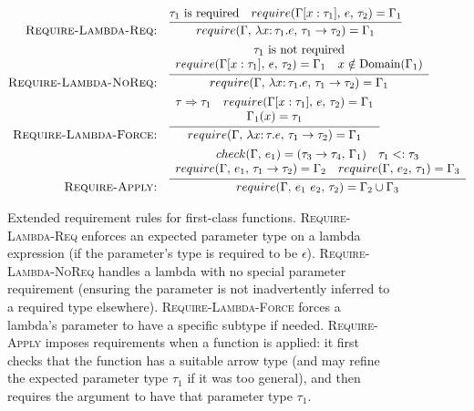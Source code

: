 \documentclass[10pt,conference]{IEEEtran}
\newcommand{\funct}[3]{\ensuremath{\lambda #1\mathsf{:}\,#2.#3}}
\newcommand{\apply}[2]{\ensuremath{#1\ #2}}
\newcommand{\arrowt}[2]{\ensuremath{{#1}\rightarrow{#2}}}
\newcommand{\checktype}[4]{\ensuremath{{check}(#1,\,#2)=(#3,\,#4)}}
\newcommand{\requiretype}[4]{\ensuremath{{require}(#1,\,#2,\,#3)=#4}}
\newcommand{\required}[1]{\ensuremath{#1\text{ is required}}}
\newcommand{\nrequired}[1]{\ensuremath{#1\text{ is not required}}}
\newcommand{\forcerequire}[2]{\ensuremath{#1\Rightarrow#2}}
\begin{document}
\begin{figure*}[ht]
\centering
\begin{framed}
\begin{align*}
\text{\textsc{Require-Lambda-Req:}} &\quad \infer{\requiretype{\Gamma}{\funct{x}{\tau_1}{e}}{\arrowt{\tau_1}{\tau_2}}{\Gamma_1}}{\required{\tau_1} \quad \requiretype{\Gamma[x:\tau_1]}{e}{\tau_2}{\Gamma_1}} \\
\text{\textsc{Require-Lambda-NoReq:}} &\quad \infer{\requiretype{\Gamma}{\funct{x}{\tau_1}{e}}{\arrowt{\tau_1}{\tau_2}}{\Gamma_1}}{
\begin{array}{c}
\nrequired{\tau_1} \\
\requiretype{\Gamma[x:\tau_1]}{e}{\tau_2}{\Gamma_1} \quad x \notin \text{Domain}(\Gamma_1)
\end{array}
} \\
\text{\textsc{Require-Lambda-Force:}} &\quad \infer{\requiretype{\Gamma}{\funct{x}{\tau}{e}}{\arrowt{\tau_1}{\tau_2}}{\Gamma_1}}{
\begin{array}{c}
\forcerequire{\tau}{\tau_1} \quad \requiretype{\Gamma[x:\tau_1]}{e}{\tau_2}{\Gamma_1} \\
\Gamma_1(x) = \tau_1
\end{array}
} \\
\text{\textsc{Require-Apply:}} &\quad \infer{\requiretype{\Gamma}{\apply{e_1}{e_2}}{\tau_2}{\Gamma_2 \cup \Gamma_3}}{
\begin{array}{c}
\checktype{\Gamma}{e_1}{\arrowt{\tau_3}{\tau_4}}{\Gamma_1} \quad \tau_1 <: \tau_3 \\
\requiretype{\Gamma}{e_1}{\arrowt{\tau_1}{\tau_2}}{\Gamma_2} \quad \requiretype{\Gamma}{e_2}{\tau_1}{\Gamma_3}
\end{array}
}
\end{align*}
\end{framed}
\caption{Extended requirement rules for first-class functions. \textsc{Require-Lambda-Req} enforces an expected parameter type on a lambda expression (if the parameter's type is required to be $\epsilon$). \textsc{Require-Lambda-NoReq} handles a lambda with no special parameter requirement (ensuring the parameter is not inadvertently inferred to a required type elsewhere). \textsc{Require-Lambda-Force} forces a lambda's parameter to have a specific subtype if needed. \textsc{Require-Apply} imposes requirements when a function is applied: it first checks that the function has a suitable arrow type (and may refine the expected parameter type $\tau_1$ if it was too general), and then requires the argument to have that parameter type $\tau_1$.}
\label{fig:function-require-rules}
\end{figure*}
\end{document}
